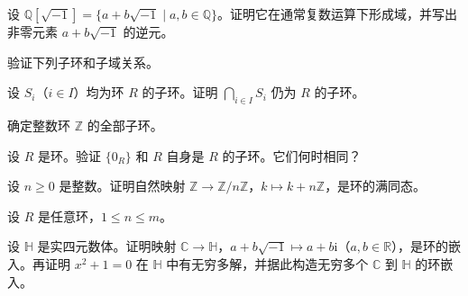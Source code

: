 \noindent\begin{minipage}{\textwidth}
设 $\mathbb{Q}[\sqrt{-1}]=\{a+b\sqrt{-1}\mid a,b\in\mathbb{Q}\}$。证明它在通常复数运算下形成域，并写出非零元素 $a+b\sqrt{-1}$ 的逆元。
\end{minipage}\par\vfill
\newpage
\noindent\begin{minipage}{\textwidth}
验证下列子环和子域关系。
\end{minipage}\par\vfill
\noindent\begin{minipage}{\textwidth}
设 $S_i$（$i\in I$）均为环 $R$ 的子环。证明 $\bigcap_{i\in I}S_i$ 仍为 $R$ 的子环。
\end{minipage}\par\vfill
\noindent\begin{minipage}{\textwidth}
确定整数环 $\mathbb{Z}$ 的全部子环。
\end{minipage}\par\vfill
\newpage
\noindent\begin{minipage}{\textwidth}
设 $R$ 是环。验证 $\{0_R\}$ 和 $R$ 自身是 $R$ 的子环。它们何时相同？
\end{minipage}\par\vfill
\noindent\begin{minipage}{\textwidth}
设 $n\ge 0$ 是整数。证明自然映射 $\mathbb{Z}\to\mathbb{Z}/n\mathbb{Z}$，$k\mapsto k+n\mathbb{Z}$，是环的满同态。
\end{minipage}\par\vfill
\noindent\begin{minipage}{\textwidth}
设 $R$ 是任意环，$1\le n\le m$。
\end{minipage}\par\vfill
\newpage
\noindent\begin{minipage}{\textwidth}
设 $\mathbb{H}$ 是实四元数体。证明映射 $\mathbb{C}\to\mathbb{H}$，$a+b\sqrt{-1}\mapsto a+b\mathrm{i}$（$a,b\in\mathbb{R}$），是环的嵌入。再证明 $x^2+1=0$ 在 $\mathbb{H}$ 中有无穷多解，并据此构造无穷多个 $\mathbb{C}$ 到 $\mathbb{H}$ 的环嵌入。
\end{minipage}\par\vfill
